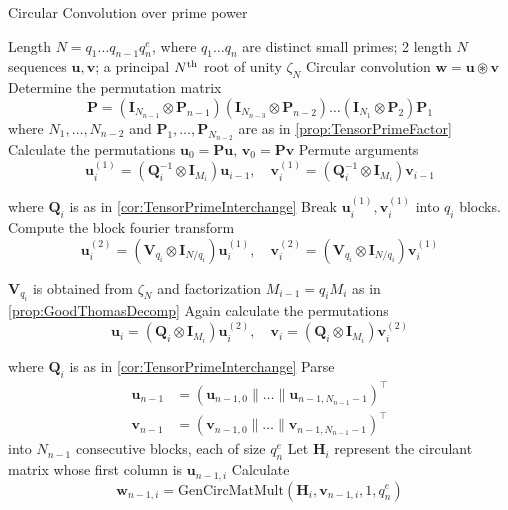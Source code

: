 \begin{algorithm}[ht]
    \caption{Circular Convolution over prime power} \label{alg:PrimePowerConvolution}
    \begin{algorithmic}[1]
        \Require Length \(N = q_1 \ldots q_{n-1} q_n^e\), where \(q_1\ldots q_n\) are distinct small primes; 2 length \(N\) sequences \(\bm{u}, \bm{v}\); a principal \(N\textsuperscript{th}\) root of unity \(\zeta_N\)
        \Ensure Circular convolution \(\bm{w} = \bm{u} \circledast \bm{v}\)
        \State Determine the permutation matrix
        \[\bm{P} = \left(\bm{I}_{N_{n-1}} \otimes \bm{P}_{n-1}\right) \left(\bm{I}_{N_{n-3}} \otimes \bm{P}_{n-2}\right) \ldots \left(\bm{I}_{N_1} \otimes \bm{P}_2\right) \bm{P}_1\]
        where \(N_1, \ldots , N_{n-2}\) and \(\bm{P}_1, \ldots , \bm{P}_{N_{n-2}}\) are as in \cref{prop:TensorPrimeFactor}
        \State Calculate the permutations \(\bm{u}_0 = \bm{P} \bm{u}\), \(\bm{v}_0 = \bm{P} \bm{v}\)
            \State Permute arguments 
            \[\bm{u}_i^{(1)} = \left(\bm{Q}_i^{-1} \otimes \bm{I}_{M_i}\right) \bm{u}_{i-1}, \quad \bm{v}_i^{(1)} = \left(\bm{Q}_i^{-1} \otimes \bm{I}_{M_i}\right) \bm{v}_{i-1}\]

            where \(\bm{Q}_i\) is as in \cref{cor:TensorPrimeInterchange}
            \State Break \(\bm{u}_i^{(1)}, \bm{v}_i^{(1)}\) into \(q_i\) blocks. Compute the block fourier transform
            \[\bm{u}_i^{(2)} = \left(\bm{V}_{q_i} \otimes \bm{I}_{N / q_i}\right) \bm{u}_i^{(1)}, \quad \bm{v}_i^{(2)} = \left(\bm{V}_{q_i} \otimes \bm{I}_{N / q_i}\right) \bm{v}_i^{(1)}\]

            \(\bm{V}_{q_i}\) is obtained from \(\zeta_N\) and factorization \(M_{i-1} = q_i M_i\) as in \cref{prop:GoodThomasDecomp}
            \State Again calculate the permutations
            \[\bm{u}_i = \left(\bm{Q}_i \otimes \bm{I}_{M_i}\right) \bm{u}_i^{(2)}, \quad \bm{v}_i = \left(\bm{Q}_i \otimes \bm{I}_{M_i}\right) \bm{v}_i^{(2)}\]

            where \(\bm{Q}_i\) is as in \cref{cor:TensorPrimeInterchange}
        \EndFor
        \State Parse
        \begin{align*}
            \bm{u}_{n-1} &= (\bm{u}_{n-1, 0} \parallel \ldots \parallel \bm{u}_{n-1, N_{n-1}-1})^{\top} \\
            \bm{v}_{n-1} &= (\bm{v}_{n-1, 0} \parallel \ldots \parallel \bm{v}_{n-1, N_{n-1}-1})^{\top}
        \end{align*}
        into \(N_{n-1}\) consecutive blocks, each of size \(q_n^e\)
            \State Let \(\bm{H}_i\) represent the circulant matrix whose first column is \(\bm{u}_{n-1, i}\)
            \State Calculate
            \[\bm{w}_{n-1, i} = \text{GenCircMatMult}(\bm{H}_i, \bm{v}_{n-1, i}, 1, q_n^e)\]


\end{algorithmic}
\end{algorithm}
